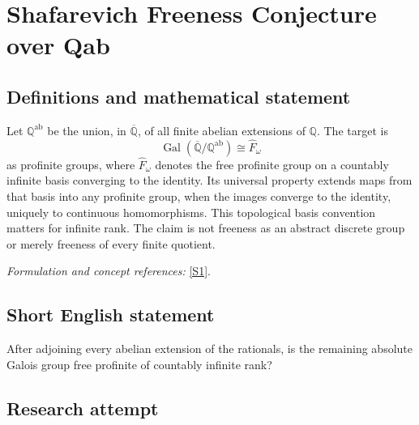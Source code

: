 \documentclass[11pt,a4paper]{article}
\newcommand{\Q}{\mathbb{Q}}
\newcommand{\sref}[2]{\hyperlink{source:#1:#2}{[S#2]}}
\newif\ifshowcatalogue
\newcommand{\cataloguescope}[1]{\ifshowcatalogue
 \paragraph{Exact scope in the supplied catalogue.}
 \begin{quote}\small #1\end{quote}\fi}
\numberwithin{equation}{section}
\begin{document}
\setcounter{section}{0}
\clearpage
\section*{\texorpdfstring{Shafarevich Freeness Conjecture over Qab}{Shafarevich Freeness Conjecture over Qab}}\label{30006802}
\subsection{Definitions and mathematical statement}
Let $\Q^{\mathrm{ab}}$ be the union, in $\overline{\Q}$, of all finite abelian extensions of $\Q$. The target is
\[
 \operatorname{Gal}(\overline{\Q}/\Q^{\mathrm{ab}})\cong\widehat F_\omega
\]
as profinite groups, where $\widehat F_\omega$ denotes the free profinite group on a countably infinite basis converging to the identity. Its universal property extends maps from that basis into any profinite group, when the images converge to the identity, uniquely to continuous homomorphisms. This topological basis convention matters for infinite rank. The claim is not freeness as an abstract discrete group or merely freeness of every finite quotient.
\par\smallskip\textit{Formulation and concept references:} \sref{30006802}{1}.
\cataloguescope{Let Qab be the maximal abelian extension of Q in an algebraic closure Qbar (equivalently the maximal cyclotomic extension). The absolute Galois group Gal(Qbar/Qab) is a free profinite group of countably infinite rank, in the standard profinite convention of a free basis converging to the identity.}
\subsection{Short English statement}
After adjoining every abelian extension of the rationals, is the remaining absolute Galois group free profinite of countably infinite rank?
\subsection{Research attempt}
\end{document}
